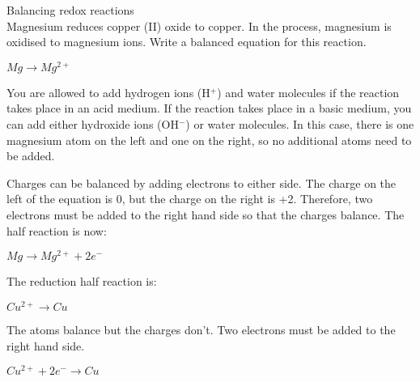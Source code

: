 \begin{wex}{Balancing redox reactions\\}{Magnesium reduces copper (II) oxide to copper. In the process, magnesium is oxidised to magnesium ions. Write a balanced equation for this reaction.\\}

{

\begin{center}
\rm${Mg \rightarrow Mg^{2+}}$\\
\end{center}

You are allowed to add hydrogen ions (H$^{+}$) and water molecules if the reaction takes place in an acid medium. If the reaction takes place in a basic medium, you can add either hydroxide ions (OH$^{-}$) or water molecules. In this case, there is one magnesium atom on the left and one on the right, so no additional atoms need to be added.\\

Charges can be balanced by adding electrons to either side. The charge on the left of the equation is 0, but the charge on the right is +2. Therefore, two electrons must be added to the right hand side so that the charges balance. The half reaction is now:

\begin{center}
\rm${Mg \rightarrow Mg^{2+} + 2e^{-}}$\\
\end{center}

The reduction half reaction is:

\begin{center}
\rm${Cu^{2+} \rightarrow Cu}$
\end{center}

The atoms balance but the charges don't. Two electrons must be added to the right hand side.

\begin{center}
\rm${Cu^{2+} + 2e^{-} \rightarrow Cu}$\\
\end{center}

}
\end{wex}
